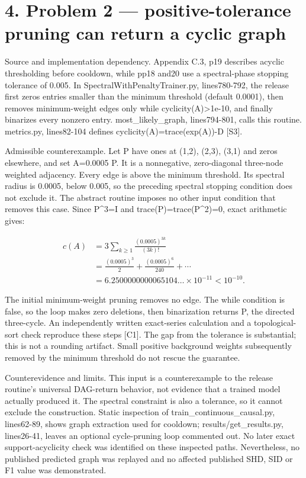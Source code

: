 \documentclass[10pt]{article}
\begin{document}
\section*{4. Problem 2 — positive-tolerance pruning can return a cyclic graph}
Source and implementation dependency. Appendix C.3, p19 describes acyclic thresholding before cooldown, while pp18 and20 use a spectral-phase stopping tolerance of 0.005. In SpectralWithPenaltyTrainer.py, lines780-792, the release first zeros entries smaller than the minimum threshold (default 0.0001), then removes minimum-weight edges only while cyclicity(A)>1e-10, and finally binarizes every nonzero entry. most\_likely\_graph, lines794-801, calls this routine. metrics.py, lines82-104 defines cyclicity(A)=trace(exp(A))-D [S3].\par
Admissible counterexample. Let P have ones at (1,2), (2,3), (3,1) and zeros elsewhere, and set A=0.0005 P. It is a nonnegative, zero-diagonal three-node weighted adjacency. Every edge is above the minimum threshold. Its spectral radius is 0.0005, below 0.005, so the preceding spectral stopping condition does not exclude it. The abstract routine imposes no other input condition that removes this case. Since P\textasciicircum{}3=I and trace(P)=trace(P\textasciicircum{}2)=0, exact arithmetic gives:\par
\[\begin{aligned}c(A)&=3\sum_{k\ge1}\frac{(0.0005)^{3k}}{(3k)!}\\&=\frac{(0.0005)^3}{2}+\frac{(0.0005)^6}{240}+\cdots\\&=6.2500000000065104\ldots\times10^{-11}<10^{-10}.\end{aligned}\]\par
The initial minimum-weight pruning removes no edge. The while condition is false, so the loop makes zero deletions, then binarization returns P, the directed three-cycle. An independently written exact-series calculation and a topological-sort check reproduce these steps [C1]. The gap from the tolerance is substantial; this is not a rounding artifact. Small positive background weights subsequently removed by the minimum threshold do not rescue the guarantee.\par
Counterevidence and limits. This input is a counterexample to the release routine’s universal DAG-return behavior, not evidence that a trained model actually produced it. The spectral constraint is also a tolerance, so it cannot exclude the construction. Static inspection of train\_continuous\_causal.py, lines62-89, shows graph extraction used for cooldown; results/get\_results.py, lines26-41, leaves an optional cycle-pruning loop commented out. No later exact support-acyclicity check was identified on these inspected paths. Nevertheless, no published predicted graph was replayed and no affected published SHD, SID or F1 value was demonstrated.\par
\end{document}
